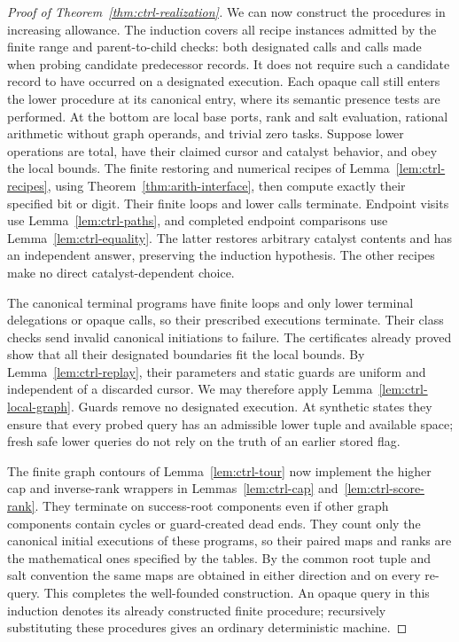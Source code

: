 \documentclass[11pt]{article}
\numberwithin{equation}{section}
\theoremstyle{definition}
\theoremstyle{remark}
\begin{document}
\begin{proof}[Proof of Theorem~\ref{thm:ctrl-realization}]
We can now construct the procedures in increasing allowance.  The induction covers
all recipe instances admitted by the finite range and parent-to-child
checks: both designated calls and calls made when probing candidate
predecessor records.  It does not require such a candidate record to
have occurred on a designated execution.  Each opaque call still enters
the lower procedure at its canonical entry, where its semantic presence
tests are performed.  At the bottom are
local base ports, rank and salt evaluation, rational arithmetic without
graph operands, and trivial zero tasks.  Suppose lower operations are
total, have their claimed cursor and catalyst behavior, and obey the
local bounds.  The finite restoring and numerical recipes of
Lemma~\ref{lem:ctrl-recipes}, using
Theorem~\ref{thm:arith-interface}, then compute exactly their specified
bit or digit.  Their finite loops and lower calls terminate.  Endpoint
visits use Lemma~\ref{lem:ctrl-paths}, and completed endpoint comparisons
use Lemma~\ref{lem:ctrl-equality}.  The latter restores arbitrary
catalyst contents and has an independent answer, preserving the
induction hypothesis.  The other recipes make no direct
catalyst-dependent choice.

The canonical terminal programs have finite loops and only lower
terminal delegations or opaque calls, so their prescribed executions
terminate.  Their class checks send invalid canonical initiations to
failure.  The certificates already proved show that all their
designated boundaries fit the local bounds.  By
Lemma~\ref{lem:ctrl-replay}, their parameters and static guards are
uniform and independent of a discarded cursor.  We may therefore
apply Lemma~\ref{lem:ctrl-local-graph}.  Guards remove no designated
execution.  At synthetic states they ensure that every probed query
has an admissible lower tuple and available space; fresh safe lower
queries do not rely on the truth of an earlier stored flag.

The finite graph contours of Lemma~\ref{lem:ctrl-tour} now implement
the higher cap and inverse-rank wrappers in
Lemmas~\ref{lem:ctrl-cap} and~\ref{lem:ctrl-score-rank}.  They terminate
on success-root components even if other graph components contain
cycles or guard-created dead ends.  They count only the canonical
initial executions of these programs, so their paired maps and ranks
are the mathematical ones specified by the tables.  By the common root
tuple and salt convention the same maps are obtained in either
direction and on every re-query.  This completes the well-founded
construction.  An opaque query in this induction denotes its already
constructed finite procedure; recursively substituting these
procedures gives an ordinary deterministic machine.


\end{proof}
\end{document}
